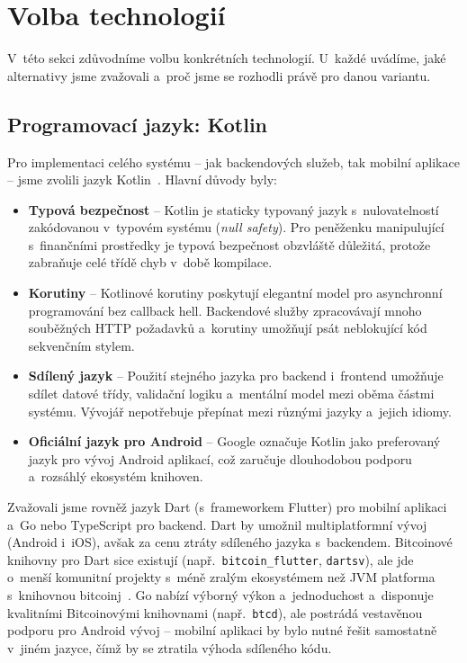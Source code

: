 \section{Volba technologií}
\label{sec:technologie}

V~této sekci zdůvodníme volbu konkrétních technologií. U~každé uvádíme, jaké
alternativy jsme zvažovali a~proč jsme se rozhodli právě pro danou variantu.

\subsection{Programovací jazyk: Kotlin}

Pro implementaci celého systému -- jak backendových služeb, tak mobilní
aplikace -- jsme zvolili jazyk Kotlin~\cite{KotlinLang}. Hlavní důvody byly:

\begin{itemize}
\item \textbf{Typová bezpečnost} -- Kotlin je staticky typovaný jazyk
  s~nulovatelností zakódovanou v~typovém systému (\emph{null safety}).
  Pro peněženku manipulující s~finančními prostředky je typová bezpečnost
  obzvláště důležitá, protože zabraňuje celé třídě chyb v~době kompilace.
\item \textbf{Korutiny} -- Kotlinové korutiny poskytují elegantní model
  pro asynchronní programování bez callback hell. Backendové služby zpracovávají
  mnoho souběžných HTTP požadavků a~korutiny umožňují psát neblokující kód
  sekvenčním stylem.
\item \textbf{Sdílený jazyk} -- Použití stejného jazyka pro backend i~frontend
  umožňuje sdílet datové třídy, validační logiku a~mentální model mezi oběma
  částmi systému. Vývojář nepotřebuje přepínat mezi různými jazyky a~jejich
  idiomy.
\item \textbf{Oficiální jazyk pro Android} -- Google označuje Kotlin jako
  preferovaný jazyk pro vývoj Android aplikací, což zaručuje dlouhodobou
  podporu a~rozsáhlý ekosystém knihoven.
\end{itemize}

Zvažovali jsme rovněž jazyk Dart (s~frameworkem Flutter) pro mobilní aplikaci
a~Go nebo TypeScript pro backend. Dart by umožnil multiplatformní vývoj
(Android i~iOS), avšak za cenu ztráty sdíleného jazyka s~backendem.
Bitcoinové knihovny pro Dart sice existují (např.\ \texttt{bitcoin\_flutter},
\texttt{dartsv}), ale jde o~menší komunitní projekty s~méně zralým ekosystémem
než JVM platforma s~knihovnou bitcoinj~\cite{BitcoinJ}. Go nabízí výborný výkon
a~jednoduchost a~disponuje kvalitními Bitcoinovými knihovnami (např.\ \texttt{btcd}),
ale postrádá vestavěnou podporu pro Android vývoj -- mobilní aplikaci
by bylo nutné řešit samostatně v~jiném jazyce, čímž by se ztratila výhoda
sdíleného kódu.

